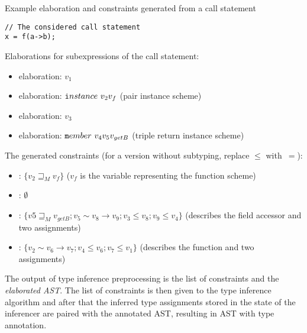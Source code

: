 \begin{codex}
    \caption{Example elaboration and constraints generated from a call statement}
    \label{lst:elab}

    \begin{lstlisting}
// The considered call statement
x = f(a->b);
    \end{lstlisting}

    \begin{flushleft}
        \noindent Elaborations for subexpressions of the call statement:
    \end{flushleft}

    \begin{itemize}
        \item {} elaboration: $v_1$

        \item {} elaboration: $\mathtt{i}nstance\ v_2 v_f$ (pair instance scheme)

        \item {} elaboration: $v_3$

        \item {} elaboration: $\mathtt{m}ember\ v_4 v_5 v_{getB}$ (triple return instance scheme)
    \end{itemize}


    \begin{flushleft}
        \noindent The generated constraints (for a version without subtyping, replace $\leq$ with~$=$):
    \end{flushleft}

    \begin{itemize}
        \item {}: $\{v_2 \sqsupseteq_M v_f\}$ ($v_f$ is the variable representing the function scheme)

        \item {}: $\emptyset$

        \item {}: $\{v5 \sqsupseteq_M v_{getB}; v_5 \sim v_8 \to v_9; v_3 \leq v_8; v_9 \leq v_4\}$ (describes the field accessor and two assignments)

        \item {}: $\{v_2 \sim v_6 \to v_7; v_4 \leq v_6; v_7 \leq v_1\}$ (describes the function and two assignments)
    \end{itemize}
\end{codex}

The output of type inference preprocessing is the list of constraints and the \emph{elaborated AST}. The list of constraints is then given to the type inference algorithm and after that the inferred type assignments stored in the state of the inferencer are paired with the annotated AST, resulting in AST with type annotation.

